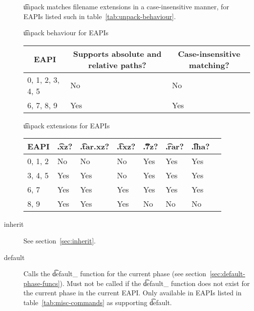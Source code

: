 \begin{description}
     \t{unpack} matches filename extensions in a case-insensitive
    manner, for EAPIs listed such in table~\ref{tab:unpack-behaviour}.

    \begin{centertable}{\t{unpack} behaviour for EAPIs}
        \label{tab:unpack-behaviour}
        \begin{tabular}{lll}
          \toprule
          \multicolumn{1}{c}{\textbf{EAPI}} &
          \multicolumn{1}{c}{\textbf{Supports absolute and relative paths?}} &
          \multicolumn{1}{c}{\textbf{Case-insensitive matching?}} \\
          \midrule
          0, 1, 2, 3, 4, 5  & No  & No  \\
          6, 7, 8, 9        & Yes & Yes \\
          \bottomrule
        \end{tabular}
    \end{centertable}

    \begin{centertable}{\t{unpack} extensions for EAPIs}
        \label{tab:unpack-extensions-table}
        \begin{tabular}{llllllll}
          \toprule
          \multicolumn{1}{c}{\textbf{EAPI}} &
          \multicolumn{1}{c}{\textbf{\t{.xz}?}} &
          \multicolumn{1}{c}{\textbf{\t{.tar.xz}?}} &
          \multicolumn{1}{c}{\textbf{\t{.txz}?}} &
          \multicolumn{1}{c}{\textbf{\t{.7z}?}} &
          \multicolumn{1}{c}{\textbf{\t{.rar}?}} &
          \multicolumn{1}{c}{\textbf{\t{.lha}?}} \\
          \midrule
          0, 1, 2           & No  & No  & No  & Yes & Yes & Yes \\
          3, 4, 5           & Yes & Yes & No  & Yes & Yes & Yes \\
          6, 7              & Yes & Yes & Yes & Yes & Yes & Yes \\
          8, 9              & Yes & Yes & Yes & No  & No  & No  \\
          \bottomrule
        \end{tabular}
    \end{centertable}

\item[inherit] See section~\ref{sec:inherit}.

\item[default]
     Calls the \t{default_} function for the current phase (see
    section~\ref{sec:default-phase-funcs}). Must not be called if the \t{default_} function does
    not exist for the current phase in the current EAPI\@. Only available in EAPIs listed in
    table~\ref{tab:misc-commands} as supporting \t{default}.


\end{description}
